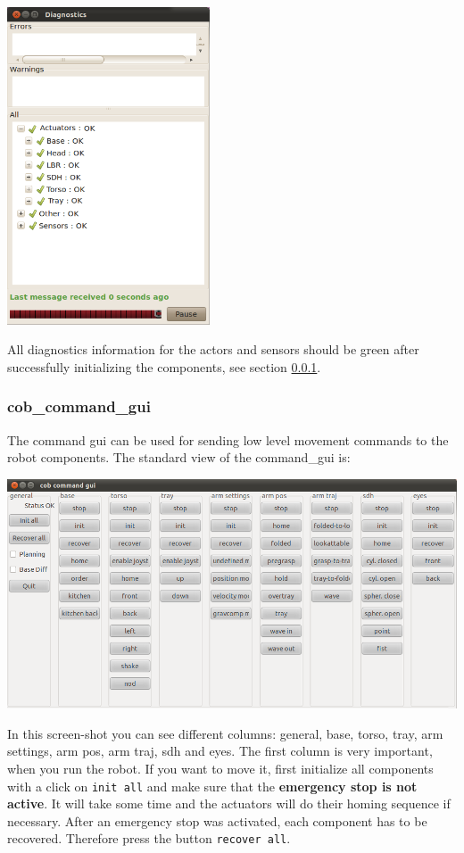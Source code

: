 \begin{center}
\includegraphics[width=0.45\textwidth]{images/diagnostics.png}
\end{center}

All diagnostics information for the actors and sensors should be green after successfully initializing the components, see section \ref{subsec:command_gui}.

\subsubsection{cob\_command\_gui}\label{subsec:command_gui}
The command gui can be used for sending low level movement commands to the robot components. The standard view of the command\_gui is:
\begin{center}
 \includegraphics[width=1\textwidth]{images/cob_command_gui.png}
\end{center}

In this screen-shot you can see different columns: general, base, torso, tray, arm settings, arm pos, arm traj, sdh and eyes. The first column is very important, when you run the robot. If you want to move it, first initialize all components with a click on \texttt{init all} and make sure that the \textbf{emergency stop is not active}. It will take some time and the actuators will do their homing sequence if necessary. After an emergency stop was activated, each component has to be recovered. Therefore press the button \texttt{recover all}. 


